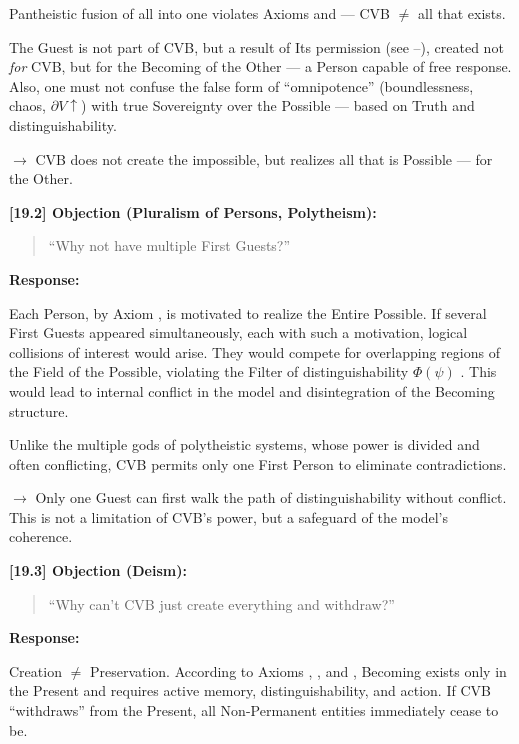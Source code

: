 \documentclass[12pt]{article}
\begin{document}
Pantheistic fusion of all into one violates Axioms \text{[4.4]} and \text{[5]} — CVB $\neq$ all that exists.

The Guest is not part of CVB, but a result of Its permission (see \text{[16]}–\text{[17]}), created not \emph{for} CVB, but for the Becoming of the Other — a Person capable of free response. Also, one must not confuse the false form of ``omnipotence'' (boundlessness, chaos, $\partial V \uparrow$) with true Sovereignty over the Possible — based on Truth and distinguishability.

$\rightarrow$ CVB does not create the impossible, but realizes all that is Possible — for the Other.

\bigskip

\textbf{[19.2] Objection (Pluralism of Persons, Polytheism):}

\begin{quote}
``Why not have multiple First Guests?''
\end{quote}

\textbf{Response:}

Each Person, by Axiom \text{[12.3]}, is motivated to realize the Entire Possible. If several First Guests appeared simultaneously, each with such a motivation, logical collisions of interest would arise. They would compete for overlapping regions of the Field of the Possible, violating the Filter of distinguishability $\Phi(\psi)$ \text{[11.1.1]}. This would lead to internal conflict in the model and disintegration of the Becoming structure.

Unlike the multiple gods of polytheistic systems, whose power is divided and often conflicting, CVB permits only one First Person to eliminate contradictions.

$\rightarrow$ Only one Guest can first walk the path of distinguishability without conflict. This is not a limitation of CVB’s power, but a safeguard of the model’s coherence.

\bigskip

\textbf{[19.3] Objection (Deism):}

\begin{quote}
``Why can’t CVB just create everything and withdraw?''
\end{quote}

\textbf{Response:}

Creation $\neq$ Preservation. According to Axioms \text{[7]}, \text{[10.3.6]}, and \text{[10.3.8]}, Becoming exists only in the Present and requires active memory, distinguishability, and action. If CVB ``withdraws'' from the Present, all Non-Permanent entities immediately cease to be.
\end{document}
